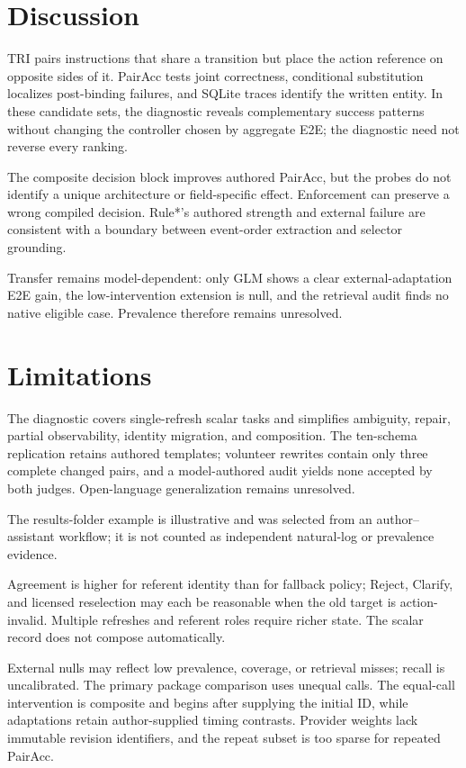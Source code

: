 \documentclass[letterpaper]{article}
\begin{document}
\section{Discussion}

TRI pairs instructions that share a transition but place the action reference on opposite sides of
it. PairAcc tests joint correctness, conditional substitution localizes post-binding failures, and
SQLite traces identify the written entity. In these candidate sets, the diagnostic reveals
complementary success patterns without changing the controller chosen by aggregate E2E; the
diagnostic need not reverse every ranking.

The composite decision block improves authored PairAcc, but the probes do not identify a unique
architecture or field-specific effect. Enforcement can preserve a wrong compiled decision. Rule*'s
authored strength and external failure are consistent with a boundary between event-order
extraction and selector grounding.

Transfer remains model-dependent: only GLM shows a clear external-adaptation E2E gain, the
low-intervention extension is null, and the retrieval audit finds no native eligible case.
Prevalence therefore remains unresolved.

\section{Limitations}

The diagnostic covers single-refresh scalar tasks and simplifies ambiguity, repair, partial
observability, identity migration, and composition. The ten-schema replication retains authored
templates; volunteer rewrites contain only three complete changed pairs, and a model-authored audit
yields none accepted by both judges. Open-language generalization remains unresolved.

The results-folder example is illustrative and was selected from an author--assistant workflow;
it is not counted as independent natural-log or prevalence evidence.

Agreement is higher for referent identity than for fallback policy; Reject, Clarify, and
licensed reselection may each be reasonable when the old target is action-invalid. Multiple
refreshes and referent roles require richer state. The scalar record does not compose automatically.

External nulls may reflect low prevalence, coverage, or retrieval misses; recall is uncalibrated.
The primary package comparison uses unequal calls. The equal-call intervention is composite and
begins after supplying the initial ID, while adaptations retain author-supplied timing contrasts.
Provider weights lack immutable revision identifiers, and the repeat subset is too sparse for
repeated PairAcc.
\end{document}
